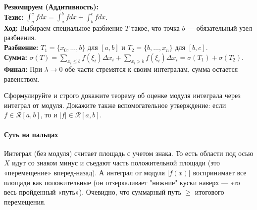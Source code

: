 \begin{tcolorbox}[colback=gray!5, colframe=black, boxrule=0.5pt, arc=0pt]
\textbf{Резюмируем (Аддитивность):} \\
\textbf{Тезис:} $\int_a^c f dx = \int_a^b f dx + \int_b^c f dx$. \\
\textbf{Ход:} Выбираем специальное разбиение $T$ такое, что точка $b$ — обязательный узел разбиения. \\
\textbf{Разбиение:} $T_1 = \{x_0, \dots, b\}$ для $[a,b]$ и $T_2 = \{b, \dots, x_n\}$ для $[b,c]$. \\
\textbf{Сумма:} $\sigma(T) = \sum_{x_i \le b} f(\xi_i)\Delta x_i + \sum_{x_i > b} f(\xi_i)\Delta x_i = \sigma(T_1) + \sigma(T_2)$. \\
\textbf{Финал:} При $\lambda \to 0$ обе части стремятся к своим интегралам, сумма остается равенством.
\end{tcolorbox}


{Сформулируйте и строго докажите теорему об оценке модуля интеграла через интеграл от модуля. Докажите также вспомогательное утверждение: если $f\in\mathcal{R}[a,b]$, то и $|f|\in\mathcal{R}[a,b]$.}

\paragraph{Суть на пальцах}
Интеграл (без модуля) считает площадь с учетом знака. То есть области под осью $X$ идут со знаком минус и съедают часть положительной площади (это «перемещение» вперед-назад). А интеграл от модуля $|f(x)|$ воспринимает все площади как положительные (он отзеркаливает "нижние" куски наверх — это весь пройденный «путь»). Очевидно, что суммарный путь $\ge$ итогового перемещения.

\vspace{0.5em}
\begin{center}
\end{center}
\vspace{0.5em}

